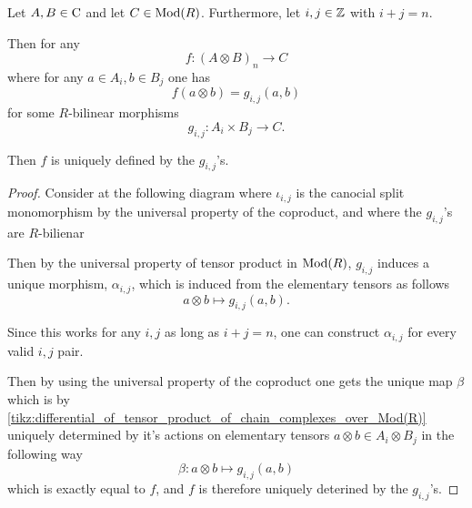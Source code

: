 \begin{lemma}
    \label{lem:map_out_of_tensor_unique}
    Let \( A, B \in \operatorname{C} \) and let \( C \in \operatorname{Mod}(R) \). Furthermore, let \( i, j \in {\mathbb{Z}} \) with \( i + j = n \).

    Then for any
    \[
        f: (A \otimes B)_n \to C
    \]
    where for any \( a \in A_i, b \in B_j \) one has
    \[
        f(a \otimes b) = g_{i, j}(a, b)
    \]
    for some \( R \)-bilinear morphisms
    \[
        g_{i, j}: A_i \times B_j \to C.
    \]

    Then \( f \) is uniquely defined by the \( g_{i, j} \)'s.
\end{lemma}
\begin{proof}
    Consider at the following diagram where \( \iota_{i, j} \) is the canocial split monomorphism by the universal property of the coproduct, and where the \( g_{i, j} \)'s are \( R \)-bilienar
    \begin{diagramlabel}[\label{tikz:differential_of_tensor_product_of_chain_complexes_over_Mod(R)}]
    \end{diagramlabel}

    Then by the universal property of tensor product in \( \operatorname{Mod}(R) \), \( g_{i, j} \) induces a unique morphism, \( \alpha_{i, j} \), which is induced from the elementary tensors as follows
    \[
        a \otimes b \mapsto g_{i, j}(a, b).
    \]

    Since this works for any \( i, j \) as long as \( i + j = n \), one can construct \( \alpha_{i, j} \) for every valid \( i, j \) pair.

    Then by using the universal property of the coproduct one gets the unique map \( \beta \) which is by \autoref{tikz:differential_of_tensor_product_of_chain_complexes_over_Mod(R)} uniquely determined by it's actions on elementary tensors \( a \otimes b \in A_i \otimes B_j \) in the following way
    \[
        \beta: a \otimes b \mapsto g_{i, j}(a, b)
    \]
    which is exactly equal to \( f \), and \( f \) is therefore uniquely deterined by the \( g_{i, j} \)'s.
\end{proof}

